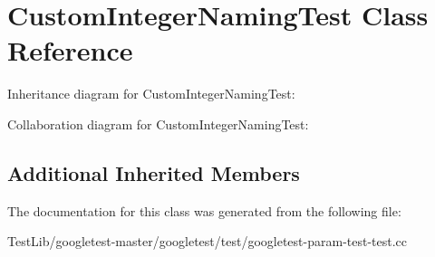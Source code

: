 \hypertarget{classCustomIntegerNamingTest}{}\section{Custom\+Integer\+Naming\+Test Class Reference}
\label{classCustomIntegerNamingTest}


Inheritance diagram for Custom\+Integer\+Naming\+Test\+:


Collaboration diagram for Custom\+Integer\+Naming\+Test\+:
\subsection*{Additional Inherited Members}


The documentation for this class was generated from the following file\+:\begin{DoxyCompactItemize}
\item 
Test\+Lib/googletest-\/master/googletest/test/googletest-\/param-\/test-\/test.\+cc\end{DoxyCompactItemize}

